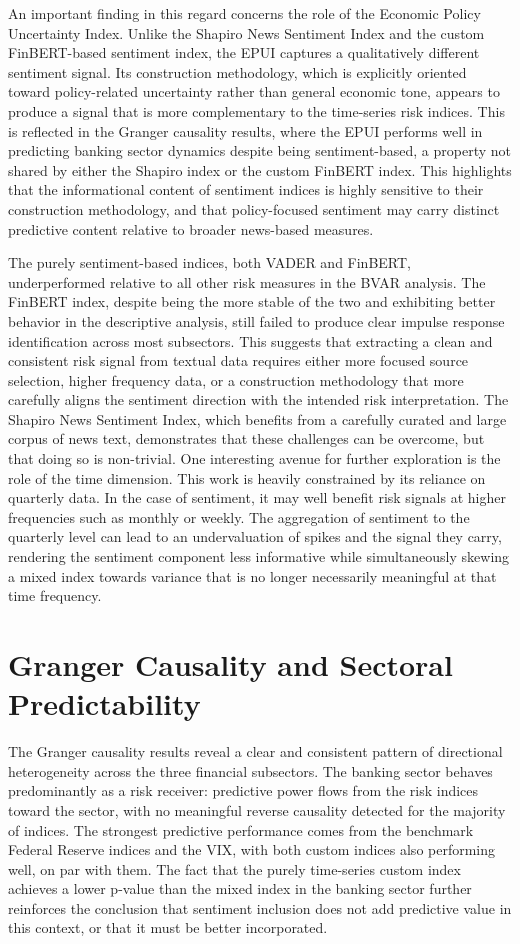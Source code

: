 \documentclass[12pt,a4paper]{report}\usepackage[a4paper, top=2.5cm, bottom=2.5cm, left=2.5cm, right=2.5cm]{geometry}
\begin{document}
An important finding in this regard concerns the role of the Economic Policy
Uncertainty Index. Unlike the Shapiro News Sentiment Index and the custom
FinBERT-based sentiment index, the EPUI captures a qualitatively different
sentiment signal. Its construction methodology, which is explicitly oriented toward
policy-related uncertainty rather than general economic tone, appears to produce
a signal that is more complementary to the time-series risk indices. This is
reflected in the Granger causality results, where the EPUI performs well in
predicting banking sector dynamics despite being sentiment-based, a property not
shared by either the Shapiro index or the custom FinBERT index. This highlights 
that the informational content of sentiment indices is highly sensitive to their
construction methodology, and that policy-focused sentiment may carry distinct
predictive content relative to broader news-based measures.

The purely sentiment-based indices, both VADER and FinBERT, underperformed
relative to all other risk measures in the BVAR analysis. The FinBERT index,
despite being the more stable of the two and exhibiting better behavior in the
descriptive analysis, still failed to produce clear impulse response identification
across most subsectors. This suggests that extracting a clean and consistent risk
signal from textual data requires either more focused source selection, higher
frequency data, or a construction methodology that more carefully aligns the
sentiment direction with the intended risk interpretation. The Shapiro News
Sentiment Index, which benefits from a carefully curated and large corpus of
news text, demonstrates that these challenges can be overcome, but that doing
so is non-trivial. One interesting avenue for further exploration is the role of the time dimension. This work is heavily constrained by its reliance on quarterly data. In the case of sentiment, it may well benefit risk signals at higher frequencies such as monthly or weekly. The aggregation of sentiment to the quarterly level can lead to an undervaluation of spikes and the signal they carry, rendering the sentiment component less informative while simultaneously skewing a mixed index towards variance that is no longer necessarily meaningful at that time frequency.  
\section{Granger Causality and Sectoral Predictability}

The Granger causality results reveal a clear and consistent pattern of directional heterogeneity across the three financial subsectors. The banking sector behaves predominantly as a risk receiver: predictive power flows from the risk indices toward the sector, with no meaningful reverse causality detected for the majority of indices. The strongest predictive performance comes from the benchmark Federal Reserve indices and the VIX, with both custom indices also performing well, on par with them. The fact that the purely time-series custom index achieves a lower p-value than the mixed index in the banking sector further reinforces the conclusion that sentiment inclusion does not add predictive value in this context, or that it must be better incorporated.
\end{document}
